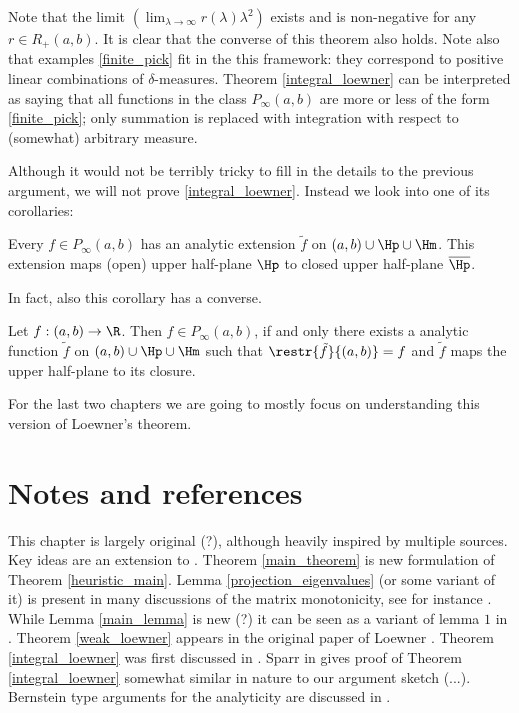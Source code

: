 Note that the limit $\left(\lim_{\lambda \to \infty} r(\lambda) \lambda^2 \right)$ exists and is non-negative for any $r \in R_{+}(a, b)$. It is clear that the converse of this theorem also holds. Note also that examples \ref{finite_pick} fit in the this framework: they correspond to positive linear combinations of $\delta$-measures. Theorem \ref{integral_loewner} can be interpreted as saying that all functions in the class $P_{\infty}(a, b)$ are more or less of the form \ref{finite_pick}; only summation is replaced with integration with respect to (somewhat) arbitrary measure.

Although it would not be terribly tricky to fill in the details to the previous argument, we will not prove \ref{integral_loewner}. Instead we look into one of its corollaries:

\begin{kor}
	Every $f \in P_{\infty}(a, b)$ has an analytic extension $\tilde{f}$ on $(a, b) \cup \Hp \cup \Hm$. This extension maps (open) upper half-plane $\Hp$ to closed upper half-plane $\overline{\Hp}$.
\end{kor}

In fact, also this corollary has a converse.

\begin{lause}\label{weak_loewner}
	Let $f : (a, b) \to \R$. Then $f \in P_{\infty}(a, b)$, if and only there exists a analytic function $\tilde{f}$ on $(a, b) \cup \Hp \cup \Hm$ such that $\restr{\tilde{f}}{(a, b)} = f$ and $\tilde{f}$ maps the upper half-plane to its closure.
\end{lause}

For the last two chapters we are going to mostly focus on understanding this version of Loewner's theorem.

\section{Notes and references}

This chapter is largely original (?), although heavily inspired by multiple sources. Key ideas are an extension to \cite{Heina}. Theorem \ref{main_theorem} is new formulation of Theorem \ref{heuristic_main}. Lemma \ref{projection_eigenvalues} (or some variant of it) is present in many discussions of the matrix monotonicity, see for instance \cite{Don}. While Lemma \ref{main_lemma} is new (?) it can be seen as a variant of lemma $1$ in \cite{Sparr}. Theorem \ref{weak_loewner} appears in the original paper of Loewner \cite{Low}. Theorem \ref{integral_loewner} was first discussed in \cite{Ben}. Sparr in \cite{Sparr} gives proof of Theorem \ref{integral_loewner} somewhat similar in nature to our argument sketch (...). Bernstein type arguments for the analyticity are discussed in \cite{Ben}.
